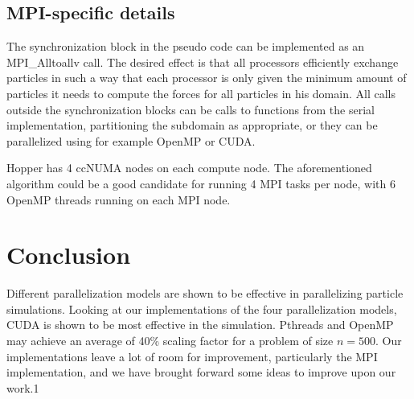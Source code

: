 \documentclass[11pt]{article}
\begin{document}
\subsection{MPI-specific details}
The synchronization block in the pseudo code can be implemented as an MPI\_Alltoallv call. The desired effect is that all processors efficiently exchange particles in such a way that each processor is only given the minimum amount of particles it needs to compute the forces for all particles in his domain. All calls outside the synchronization blocks can be calls to functions from the serial implementation, partitioning the subdomain as appropriate, or they can be parallelized using for example OpenMP or CUDA.	

Hopper has 4 ccNUMA nodes on each compute node. The aforementioned algorithm could be a good candidate for running 4 MPI tasks per node, with 6 OpenMP threads running on each MPI node. 

\FloatBarrier
\section{Conclusion}
Different parallelization models are shown to be effective in parallelizing particle simulations. Looking at our implementations of the four parallelization models, CUDA is shown to be most effective in the simulation. Pthreads and OpenMP may achieve an average of 40\% scaling factor for a problem of size $n = 500$. Our implementations leave a lot of room for improvement, particularly the MPI implementation, and we have brought forward some ideas to improve upon our work.1


\end{document}
